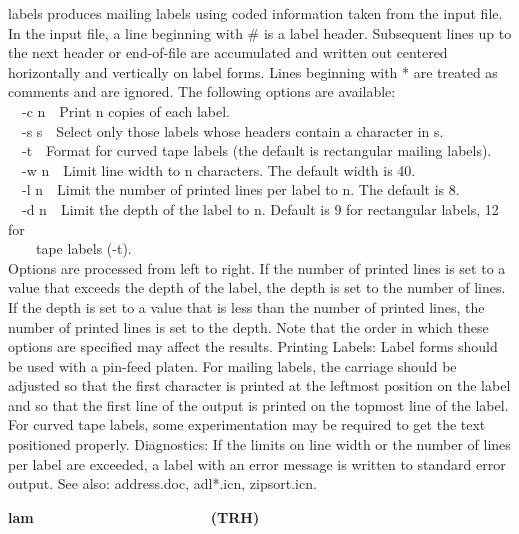 \textsf{labels} produces mailing labels using coded information taken
from the input file. In the input file, a line beginning with \# is a
label header. Subsequent lines up to the next header or end-of-file are
accumulated and written out centered horizontally and vertically on
label forms. Lines beginning with * are treated as comments and are
ignored. The following options are available:\\
\ \ \textsf{{}-c n}\ \ Print n copies of each label.\\
\ \ \textsf{{}-s s}\ \ Select only those labels whose headers contain a
character in s.\\
\ \ \textsf{{}-t}\ \ Format for curved tape labels (the default is
rectangular mailing labels).\\
\ \ \textsf{{}-w n}\ \ Limit line width to n characters. The default
width is 40.\\
\ \ \textsf{{}-l n}\ \ Limit the number of printed lines per label to n.
The default is 8.\\
\ \ \textsf{{}-d n}\ \ Limit the depth of the label to n. Default is 9
for rectangular labels, 12 for\\
\ \ \ \ tape labels (\textsf{{}-t}).\\
Options are processed from left to right. If the number of printed lines
is set to a value that exceeds the depth of the label, the depth is set
to the number of lines. If the depth is set to a value that is less
than the number of printed lines, the number of printed lines is set to
the depth. Note that the order in which these options are specified may
affect the results. Printing Labels: Label forms should be used with a
pin-feed platen. For mailing labels, the carriage should be adjusted so
that the first character is printed at the leftmost position on the
label and so that the first line of the output is printed on the
topmost line of the label. For curved tape labels, some experimentation
may be required to get the text positioned properly. Diagnostics: If
the limits on line width or the number of lines per label are exceeded,
a label with an error message is written to standard error output. See
also: address.doc, adl*.icn, zipsort.icn. 

{\sffamily\bfseries
lam\ \ \ \ \ \ \ \ \ \ \ \ \ \ \ \ \ \ \ \ \ \ (TRH)}

